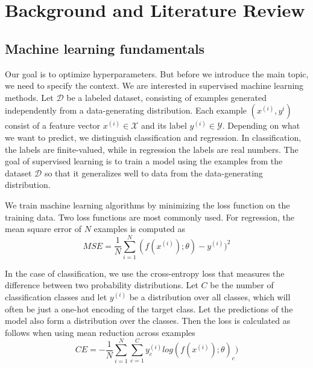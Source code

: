 \chapter{Background and Literature Review}

\label{chap:refs}

\section{Machine learning fundamentals}



Our goal is to optimize hyperparameters. But before we introduce the main topic, we need to specify the context. We are interested in supervised machine learning methods. Let $\mathcal{D}$ be a labeled dataset, consisting of examples generated independently from a data-generating distribution. Each example $(x^{(i)}, y^{i})$ consist of a feature vector $x^{(i)}\in \mathcal{X}$ and its label $y^{(i)}\in \mathcal{Y}$. Depending on what we want to predict, we distinguish classification and regression. In classification, the labels are finite-valued, while in regression the labels are real numbers. The goal of supervised learning is to train a model using the examples from the dataset $\mathcal{D}$ so that it generalizes well to data from the data-generating distribution.  %

We train machine learning algorithms by minimizing the loss function on the training data. Two loss functions are most commonly used. For regression, the mean square error of $N$ examples is computed as $$ MSE=\frac{1}{N} \sum_{i=1}^{N} (f(x^{(i)});\theta )-y^{(i)})^2$$


In the case of classification, we use the cross-entropy loss that measures the difference between two probability distributions. Let $C$ be the number of classification classes and let $y^{(i)}$ be a distribution over all classes, which will often be just a one-hot encoding of the target class. Let the predictions of the model also form a distribution over the classes. Then the loss is calculated as follows when using mean reduction across examples $$CE=-\frac{1}{N} \sum_{i=1}^{N} \sum_{c=1}^{C} y^{(i)}_c log(f(x^{(i)});\theta )_c) $$

